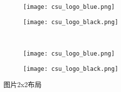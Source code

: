 \begin{figure}[!htb]
    \centering
    \begin{subfigure}[t]{0.3\linewidth}
        \captionsetup{justification=centering}
        \begin{minipage}[b]{1\linewidth}
            \centering
            \texttt{[image: csu\_logo\_blue.png]}
            \caption{}
        \end{minipage}
    \end{subfigure}
    \hspace{-5em}
    \begin{subfigure}[t]{0.3\linewidth}
        \captionsetup{justification=centering}
        \begin{minipage}[b]{1\linewidth}
            \centering
            \texttt{[image: csu\_logo\_black.png]}
            \caption{}
        \end{minipage}
    \end{subfigure}\\
    \begin{subfigure}[t]{0.3\linewidth}
        \captionsetup{justification=centering}
        \begin{minipage}[b]{1\linewidth}
            \centering
            \texttt{[image: csu\_logo\_blue.png]}
            \caption{}
        \end{minipage}
    \end{subfigure}
    \hspace{-5em}
    \begin{subfigure}[t]{0.3\linewidth}
        \captionsetup{justification=centering}
        \begin{minipage}[b]{1\linewidth}
            \centering
            \texttt{[image: csu\_logo\_black.png]}
            \caption{}
        \end{minipage}
    \end{subfigure}
    \caption{图片2x2布局}
    \label{f.csu_2x2}
\end{figure}

\newpage
